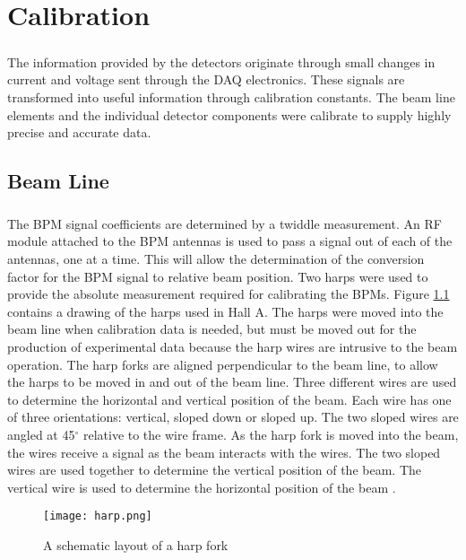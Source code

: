 
\chapter{Calibration}





\paragraph{}The information provided by the detectors originate through small changes in current and voltage sent through the DAQ electronics. These signals are transformed into useful information through calibration constants. The beam line elements and the individual detector components were calibrate to supply highly precise and accurate data. 


\section{Beam Line}
 \paragraph{} The BPM signal coefficients are determined by a twiddle measurement. An RF module attached to the BPM antennas is used to pass a signal out of each of the antennas, one at a time. This will allow the determination of the conversion factor for the BPM signal to relative beam position. Two harps were used to provide the absolute measurement required for calibrating the BPMs. Figure \ref{harp} contains a drawing of the harps used in Hall A. The harps were moved into the beam line when calibration data is needed, but must be moved out for the production of experimental data because the harp wires are intrusive to the beam operation.  The harp forks are aligned perpendicular to the beam line, to allow the harps to be moved in and out of the beam line. Three different wires are used to determine the horizontal and vertical position of the beam. Each wire has one of three orientations: vertical, sloped down or sloped up. The two sloped wires are angled at 45$^{\circ}$ relative to the wire frame. As the harp fork is moved into the beam, the wires receive a signal as the beam interacts with the wires. The two sloped wires are used together to determine the vertical position of the beam. The vertical wire is used to determine the horizontal position of the beam \cite{BPM,BPM2}. 
		 	\begin{figure}[H]
		 		\centering
		 		\caption{A schematic layout of a harp fork \cite{BPM2} }
		 		\label{harp}
		 		\texttt{[image: harp.png]} 
		 	\end{figure}  	
	 
